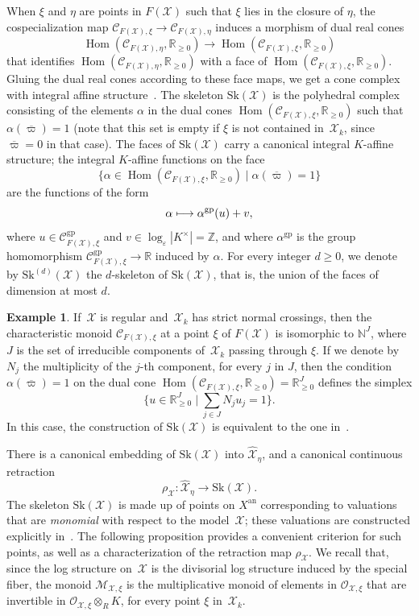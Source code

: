 \documentclass[11pt]{article}
\let\mathcal\mathscr
\newcommand{\mto}{\mathchoice{\longmapsto}{\mapsto}{\mapsto}{\mapsto}}
\theoremstyle{definition}
\newtheorem{example}[equation]{Example}
\numberwithin{equation}{subsection}
\newcommand{\N}{\ensuremath{\mathbb{N}}}
\newcommand{\Z}{\ensuremath{\mathbb{Z}}}
\newcommand{\R}{\ensuremath{\mathbb{R}}}
\newcommand{\cX}{\ensuremath{\mathscr{X}}}
\newcommand{\an}{\mathrm{an}}
\newcommand{\gp}{\mathrm{gp}}
\newcommand{\Sk}{\mathrm{Sk}}
\DeclareMathOperator{\Hom}{Hom}
\let\unif\varpi
\begin{document}
When $\xi$ and $\eta$ are points in $F(\cX)$ such that $\xi$ lies in the closure of $\eta$, the cospecialization map $\mathcal{C}_{F(\cX),\xi}\to \mathcal{C}_{F(\cX),\eta}$
induces a morphism of dual real cones
\[
\Hom(\mathcal{C}_{F(\cX),\eta},\R_{\geq 0})\to \Hom(\mathcal{C}_{F(\cX),\xi},\R_{\geq 0})
\]
that identifies $\Hom(\mathcal{C}_{F(\cX),\eta},\R_{\geq 0})$ with a face of $\Hom(\mathcal{C}_{F(\cX),\xi},\R_{\geq 0})$. Gluing the dual real cones according to these face maps, we
get a cone complex with integral affine structure~\cite{KKMS}.
The skeleton $\Sk(\cX)$ is the polyhedral complex
consisting of the elements $\alpha$ in the dual cones $\Hom(\mathcal{C}_{F(\cX),\xi},\R_{\geq 0})$ such that
$\alpha(\overline{\unif})=1$ (note that this set is empty if $\xi$ is not contained in~$\cX_k$, since $\overline{\unif}=0$ in that case). The faces of $\Sk(\cX)$ carry a canonical integral $K$\nobreakdash-affine structure; the integral $K$\nobreakdash-affine functions on the face
\[
\{\alpha\in \Hom(\mathcal{C}_{F(\cX),\xi},\R_{\geq 0})\mid \alpha(\overline{\unif})=1\}
\]
are the functions of the form
\[
\alpha\mto \alpha^{\gp}(u)+ v,
\]
where $u\in \mathcal{C}^{\gp}_{F(\cX),\xi}$ and $v\in \log_{\varepsilon}|K^{\times}|=\Z$, and where $\alpha^{\gp}$ is the group homomorphism $\mathcal{C}^{\gp}_{F(\cX),\xi}\to \R$ induced by $\alpha$.
For every integer $d\geq 0$, we denote by $\Sk^{(d)}(\cX)$ the $d$\nobreakdash-ske\-leton of $\Sk(\cX)$, that is, the union of the faces of dimension at most $d$.

\begin{example}\label{exam:snc}
If~$\cX$ is regular and~$\cX_k$ has strict normal crossings, then the characteristic monoid $\mathcal{C}_{F(\cX),\xi}$ at a point $\xi$ of $F(\cX)$ is isomorphic to $\N^J$, where $J$ is the set of irreducible components of~$\cX_k$ passing through $\xi$. If we denote by $N_j$ the multiplicity of the $j$-th component, for every $j$ in $J$, then the condition
$\alpha(\overline{\unif})=1$ on the dual cone $\Hom(\mathcal{C}_{F(\cX),\xi},\R_{\geq 0})=\R^J_{\geq 0}$ defines the simplex
\[
\{u\in \R^J_{\geq 0}\mid \textstyle\sum_{j\in J}N_ju_j=1\}.
\]
In this case, the construction of $\Sk(\cX)$ is equivalent to the one in~\cite[\S3]{MuNi}.
\end{example}

There is a canonical embedding of $\Sk(\cX)$ into $\widehat{\cX}_{\eta}$, and a canonical continuous retraction
\[
\rho_{\cX}\colon \widehat{\cX}_{\eta}\to \Sk(\cX).
\]
The skeleton $\Sk(\cX)$ is made up of points on $X^{\an}$ corresponding to valuations that are {\em monomial} with respect to the model~$\cX$; these valuations are constructed explicitly in~\cite[3.2.10]{BrMa}.
The following proposition provides a convenient criterion for such points, as well as a characterization of the retraction map $\rho_{\cX}$. We recall that, since the log structure on~$\cX$ is the divisorial log structure induced by the special fiber, the monoid $\mathcal{M}_{\cX,\xi}$ is the multiplicative monoid of elements in $\mathcal{O}_{\cX,\xi}$ that are invertible in $\mathcal{O}_{\cX,\xi}\otimes_R K$, for every point $\xi$ in~$\cX_k$.
\end{document}
